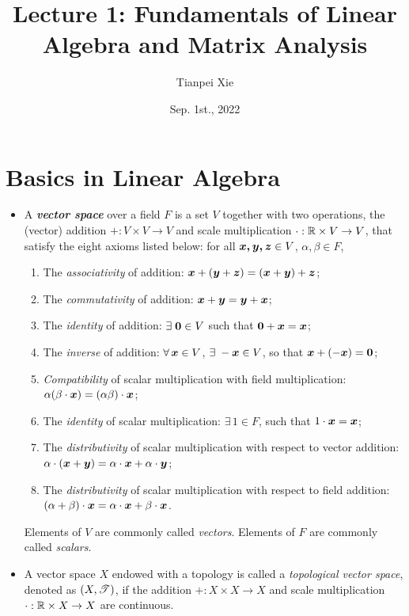 \documentclass[11pt]{article}
\begin{document}
\title{Lecture 1: Fundamentals of Linear Algebra and Matrix Analysis}
\author{Tianpei Xie}
\date{Sep. 1st., 2022}
\maketitle
\tableofcontents
\newpage
\allowdisplaybreaks
\section{Basics in Linear Algebra}
\begin{itemize}
\item A \emph{\textbf{vector space}} over a field $F$ is a set $V$ together with two operations,  the (vector) addition $+: V\times V \rightarrow V$ and scale multiplication $\cdot: {\mathbb R}\times V \rightarrow V$, that satisfy the eight axioms listed below:
for all $\boldsymbol{x, y, z}\in V$, $\alpha, \beta\in F$, 
\begin{enumerate}
\item The \emph{associativity} of addition: $\boldsymbol{x}+ (\boldsymbol{y}+ \boldsymbol{z}) = (\boldsymbol{x}+ \boldsymbol{y})+ \boldsymbol{z}$;
\item The \emph{commutativity} of addition:  $\boldsymbol{x}+ \boldsymbol{y} = \boldsymbol{y}+ \boldsymbol{x}$;
\item The \emph{identity} of addition: $\exists\;\boldsymbol{0}\in V$	 such that $\boldsymbol{0}+ \boldsymbol{x} = \boldsymbol{x}$;
\item The \emph{inverse} of addition: $\forall\, \boldsymbol{x}\in V$, $\exists\;-\boldsymbol{x}\in V$, so that $\boldsymbol{x}+ (- \boldsymbol{x}) = \boldsymbol{0}$;
\item \emph{Compatibility} of scalar multiplication with field multiplication: $\alpha(\beta \cdot\boldsymbol{x}) = (\alpha\beta)\cdot\boldsymbol{x}$;
\item The \emph{identity} of scalar multiplication: $\exists\, 1\in F$, such that $1\cdot \boldsymbol{x} = \boldsymbol{x}$;
\item The \emph{distributivity} of scalar multiplication with respect to vector addition: $\alpha\cdot (\boldsymbol{x}+\boldsymbol{y})= \alpha\cdot \boldsymbol{x}+ \alpha\cdot \boldsymbol{y}$;
\item The \emph{distributivity} of scalar multiplication with respect to field addition: $(\alpha+ \beta)\cdot \boldsymbol{x} = \alpha\cdot \boldsymbol{x}+ \beta\cdot\boldsymbol{x}$.	
\end{enumerate}
Elements of $V$ are commonly called \emph{vectors}. Elements of $F$ are commonly called \emph{scalars}.\\

\item A vector space $X$ endowed with a topology is called a \emph{topological vector space}, denoted as $(X, {\mathscr T})$, if the addition $+: X\times X \rightarrow X$ and scale multiplication $\cdot: {\mathbb R}\times X \rightarrow X$ are continuous. 


\end{itemize}
\end{document}
